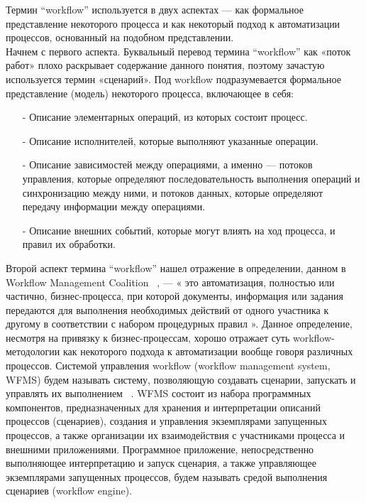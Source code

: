 \documentclass[koi8-r,usehyperref,12pt]{G7-32}
\begin{document}
Термин “workflow” используется в двух аспектах — как формальное
представление некоторого процесса и как некоторый подход к автоматизации процессов, основанный на подобном представлении.\\
Начнем с первого аспекта. Буквальный перевод термина “workflow”
как «поток работ» плохо раскрывает содержание данного понятия, поэтому
зачастую используется термин «сценарий». Под workflow подразумевается формальное представление (модель) некоторого процесса, включающее в себя:
\begin{enumerate}
\item[-] Описание элементарных операций, из которых состоит процесс.
\item[-] Описание исполнителей, которые выполняют указанные операции.
\item[-] Описание зависимостей между операциями, а именно — потоков управления, которые определяют последовательность выполнения
операций и синхронизацию между ними, и потоков данных, которые
определяют передачу информации между операциями.
\item[-] Описание внешних событий, которые могут влиять на ход процесса, и правил их обработки.
\end{enumerate}
Второй аспект термина “workflow” нашел отражение в определении,
данном в Workflow Management Coalition ~\cite{2}, — « это автоматизация, полностью или частично, бизнес-процесса, при которой документы, информация или задания передаются для выполнения необходимых действий
от одного участника к другому в соответствии с набором процедурных
правил ». Данное определение, несмотря на привязку к бизнес-процессам, хорошо отражает суть workflow-методологии как некоторого подхода
к автоматизации вообще говоря различных процессов.
Системой управления workflow (workflow management system, WFMS)
будем называть систему, позволяющую создавать сценарии, запускать
и управлять их выполнением ~\cite{2}. WFMS состоит из набора программных
компонентов, предназначенных для хранения и интерпретации описаний
процессов (сценариев), создания и управления экземплярами запущенных процессов, а также организации их взаимодействия с участниками
процесса и внешними приложениями.
Программное приложение, непосредственно выполняющее интерпретацию и запуск сценария, а также управляющее экземплярами запущенных процессов, будем называть средой выполнения сценариев (workflow engine).
\end{document}

